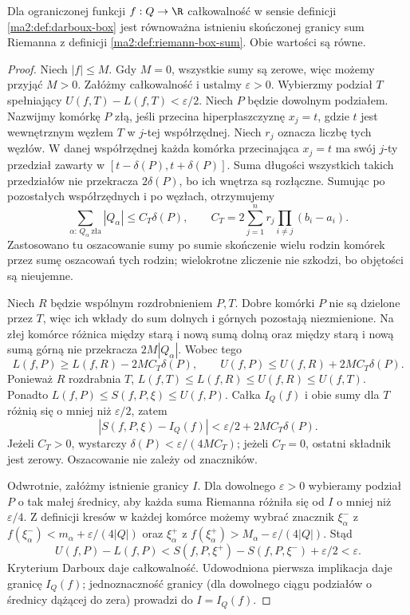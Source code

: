 \begin{twierdzenie}
\label{ma2:thm:riemann-darboux-box}
Dla ograniczonej funkcji $f:Q\to\R$
całkowalność w sensie definicji
\ref{ma2:def:darboux-box} jest równoważna
istnieniu skończonej granicy sum Riemanna
z definicji \ref{ma2:def:riemann-box-sum}.
Obie wartości są równe.
\end{twierdzenie}
\begin{proof}
Niech $|f|\le M$. Gdy $M=0$, wszystkie sumy
są zerowe, więc możemy przyjąć $M>0$.
Załóżmy całkowalność i ustalmy $\varepsilon>0$.
Wybierzmy podział $T$ spełniający
$U(f,T)-L(f,T)<\varepsilon/2$.
Niech $P$ będzie dowolnym podziałem. Nazwijmy
komórkę $P$ złą, jeśli przecina hiperpłaszczyznę
$x_j=t$, gdzie $t$ jest wewnętrznym węzłem $T$
w $j$-tej współrzędnej. Niech $r_j$ oznacza
liczbę tych węzłów. W danej współrzędnej
każda komórka przecinająca $x_j=t$ ma swój
$j$-ty przedział zawarty w
$[t-\delta(P),t+\delta(P)]$.
Suma długości wszystkich takich przedziałów
nie przekracza $2\delta(P)$, bo ich wnętrza
są rozłączne. Sumując po pozostałych
współrzędnych i po węzłach, otrzymujemy
\[
 \sum_{\alpha:\,Q_\alpha\ \text{zła}}|Q_\alpha|
 \le C_T\delta(P),\qquad
 C_T=2\sum_{j=1}^n r_j\prod_{i\ne j}(b_i-a_i).
\]
Zastosowano tu oszacowanie sumy po sumie
skończenie wielu rodzin komórek przez sumę
oszacowań tych rodzin; wielokrotne zliczenie
nie szkodzi, bo objętości są nieujemne.

Niech $R$ będzie wspólnym rozdrobnieniem $P,T$.
Dobre komórki $P$ nie są dzielone przez $T$,
więc ich wkłady do sum dolnych i górnych
pozostają niezmienione. Na złej komórce
różnica między starą i nową sumą dolną
oraz między starą i nową sumą górną
nie przekracza $2M|Q_\alpha|$.
Wobec tego
\[
 L(f,P)\ge L(f,R)-2MC_T\delta(P),\qquad
 U(f,P)\le U(f,R)+2MC_T\delta(P).
\]
Ponieważ $R$ rozdrabnia $T$,
$L(f,T)\le L(f,R)\le U(f,R)\le U(f,T)$.
Ponadto $L(f,P)\le S(f,P,\xi)\le U(f,P)$.
Całka $I_Q(f)$ i obie sumy dla $T$ różnią się
o mniej niż $\varepsilon/2$, zatem
\[
 |S(f,P,\xi)-I_Q(f)|
 <\varepsilon/2+2MC_T\delta(P).
\]
Jeżeli $C_T>0$, wystarczy
$\delta(P)<\varepsilon/(4MC_T)$; jeżeli
$C_T=0$, ostatni składnik jest zerowy.
Oszacowanie nie zależy od znaczników.

Odwrotnie, załóżmy istnienie granicy $I$.
Dla dowolnego $\varepsilon>0$ wybieramy
podział $P$ o tak małej średnicy, aby każda
suma Riemanna różniła się od $I$ o mniej
niż $\varepsilon/4$. Z definicji kresów
w każdej komórce możemy wybrać znacznik
$\xi_\alpha^-$ z
$f(\xi_\alpha^-)<m_\alpha+\varepsilon/(4|Q|)$
oraz $\xi_\alpha^+$ z
$f(\xi_\alpha^+)>M_\alpha-\varepsilon/(4|Q|)$.
Stąd
\[
 U(f,P)-L(f,P)
 < S(f,P,\xi^+)-S(f,P,\xi^-)+\varepsilon/2
 <\varepsilon.
\]
Kryterium Darboux daje całkowalność.
Udowodniona pierwsza implikacja daje granicę
$I_Q(f)$; jednoznaczność granicy (dla dowolnego
ciągu podziałów o średnicy dążącej do zera)
prowadzi do $I=I_Q(f)$.
\end{proof}

